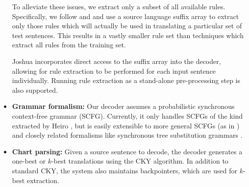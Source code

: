 \documentclass[11pt]{article}
\begin{document}
\begin{itemize}


To alleviate these issues, we extract only a subset of all available rules. Specifically, we follow  and  and use a source language suffix array to extract only those rules which will actually be used in translating a particular set of test sentences. This results in a vastly smaller rule set than techniques which extract all rules from the training set.

Joshua incorporates direct access to the suffix array into the decoder, allowing for rule extraction to be performed for each input sentence individually. Running rule extraction as a stand-alone pre-processing step is also supported.



\item \textbf{Grammar formalism:} Our decoder assumes a probabilistic synchronous context-free grammar (SCFG). Currently, it only handles SCFGs of the kind extracted by Heiro \cite{Chiang2007}, but is easily extensible to more general SCFGs (as in ) and closely related formalisms like synchronous tree substitution grammars \cite{Eisner2003}.

\item \textbf{Chart parsing:} Given a source sentence to decode, the decoder generates a one-best or $k$-best translations using the CKY algorithm.
In addition to standard CKY, the system also maintains backpointers, which are used for $k$-best extraction.


\end{itemize}
\end{document}
